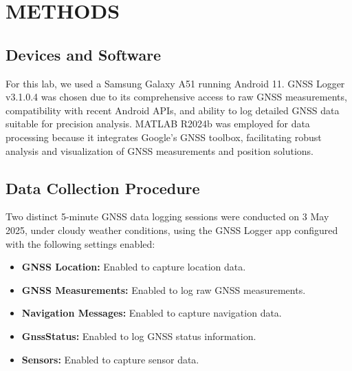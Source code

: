 
\section{METHODS} \label{sec:methods}


    \subsection{Devices and Software}
    
        For this lab, we used a Samsung Galaxy A51 running Android 11. 
        GNSS Logger v3.1.0.4 was chosen due to its comprehensive access to raw GNSS measurements, compatibility with recent Android APIs, and ability to log detailed GNSS data suitable for precision analysis. 
        MATLAB R2024b was employed for data processing because it integrates Google's GNSS toolbox, facilitating robust analysis and visualization of GNSS measurements and position solutions.

    \subsection{Data Collection Procedure}
    
        Two distinct 5-minute GNSS data logging sessions were conducted on 3 May 2025, under cloudy weather conditions, using the GNSS Logger app configured with the following settings enabled:

        \begin{itemize}
            \item \textbf{GNSS Location:} Enabled to capture location data.
            \item \textbf{GNSS Measurements:} Enabled to log raw GNSS measurements.
            \item \textbf{Navigation Messages:} Enabled to capture navigation data.
            \item \textbf{GnssStatus:} Enabled to log GNSS status information.
            \item \textbf{Sensors:} Enabled to capture sensor data.
        \end{itemize}
        
